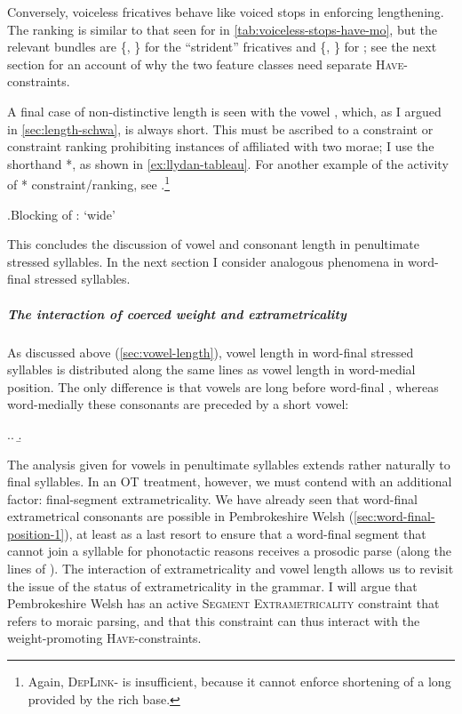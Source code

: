 Conversely, voiceless fricatives behave like voiced stops in enforcing lengthening. The ranking is similar to that seen for  in \cref{tab:voiceless-stops-have-mo}, but the relevant bundles are \{, \} for the \enquote{strident} fricatives \ipa{[s~ʃ~ɬ]} and \{, \} for \ipa{[f~θ~χ]}; see the next section for an account of why the two feature classes need separate \textsc{Have}-\mo constraints.

A final case of non-distinctive length is seen with the vowel \ipa{[ə]}, which, as I argued in \cref{sec:length-schwa}, is always short. This must be ascribed to a constraint or constraint ranking prohibiting instances of \ipa{[ə]} affiliated with two morae; I use the shorthand *\ipa{[əː]}, as shown in \cref{ex:llydan-tableau}. For another example of the activity of *\ipa{[əː]} constraint\fshyp ranking, see .\footnote{Again, \textsc{DepLink}-\mo\ipa{[ə]} is insufficient, because it cannot enforce shortening of a long \ipa{[əː]} provided by the rich base.}

\ex.\label{ex:llydan-tableau}Blocking of \ipa{[əː]}: \ipa{[ˈɬədan]} `wide'\\
\begin{OTtableau}{3}
\OTcandrow[\OThand]{[ɬə\smo [d\smo]an]}{,*,*}
\end{OTtableau}

This concludes the discussion of vowel and consonant length in penultimate stressed syllables. In the next section I consider analogous phenomena in word-final stressed syllables.

\subparagraph{The interaction of coerced weight and extrametricality}
\label{sec:inter-coerc-weight}

As discussed above (\cref{sec:vowel-length}), vowel length in word-final stressed syllables is distributed along the same lines as vowel length in word-medial position. The only difference is that vowels are long before word-final \ipa{[s~ʃ~ɬ]}, whereas word-medially these consonants are preceded by a short vowel:

\ex.\a.
\b.


The analysis given for vowels in penultimate syllables extends rather naturally to final syllables. In an OT treatment, however, we must contend with an additional factor: final-segment extrametricality. We have already seen that word-final extrametrical consonants are possible in Pembrokeshire Welsh (\cref{sec:word-final-position-1}), at least as a last resort to ensure that a word-final segment that cannot join a syllable for phonotactic reasons receives a prosodic parse (along the lines of \citealt{ito86:_syllab}). The interaction of extrametricality and vowel length allows us to revisit the issue of the status of extrametricality in the grammar. I will argue that Pembrokeshire Welsh has an active \textsc{Segment Extrametricality} constraint that refers to moraic parsing, and that this constraint can thus interact with the weight-promoting \textsc{Have}-\mo constraints.

